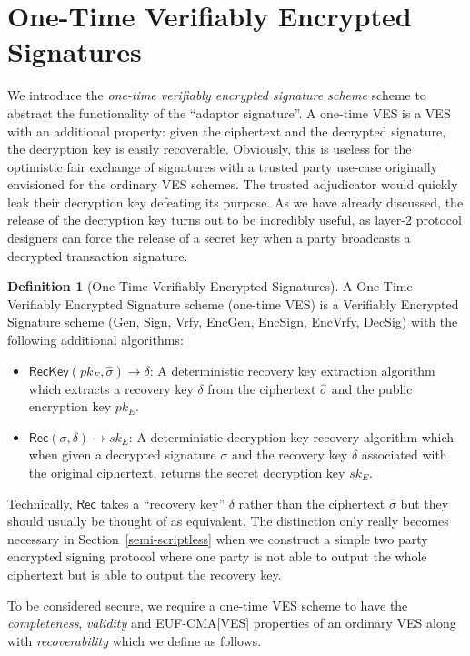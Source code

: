 \documentclass[fullpage]{article}
\theoremstyle{definition}
\newtheorem{definition}{Definition}[section]
\newcommand{\EUFCMAVES}{\textsf{EUF-CMA}[\textsf{VES}]\xspace}
\newcommand{\EncGen}{\textsf{EncGen}}
\newcommand{\EncSign}{\textsf{EncSign}}
\newcommand{\EncVer}{\textsf{EncVrfy}}
\newcommand{\DecSig}{\textsf{DecSig}}
\newcommand{\KeyGen}{\textsf{Gen}}
\newcommand{\Sign}{\textsf{Sign}}
\newcommand{\Verify}{\textsf{Vrfy}}
\newcommand{\Rec}{\textsf{Rec}}
\newcommand{\RecKey}{\textsf{RecKey}}
\newcommand{\rec}{\delta}
\newcommand{\VESALG}{\EncGen, \EncSign, \EncVer, \DecSig}
\newcommand{\SIGNALG}{\KeyGen, \Sign, \Verify}
\newcommand{\skEnc}{sk_E}
\newcommand{\pkEnc}{pk_E}
\newcommand{\hatsigma}{\hat{\sigma}}
\begin{document}
\section{One-Time Verifiably Encrypted Signatures}
\label{otVES}
We introduce the \emph{one-time verifiably encrypted signature scheme} scheme to abstract the functionality of the ``adaptor signature''\cite{poelstra-adaptor}. A one-time VES is a VES with an additional property: given the ciphertext and the decrypted signature, the decryption key is easily recoverable. Obviously, this is useless for the optimistic fair exchange of signatures with a trusted party use-case originally envisioned for the ordinary VES schemes. The trusted adjudicator would quickly leak their decryption key defeating its purpose. As we have already discussed, the release of the decryption key turns out to be incredibly useful, as layer-2 protocol designers can force the release of a secret key when a party broadcasts a decrypted transaction signature.

\begin{definition}[One-Time Verifiably Encrypted Signatures]
A One-Time Verifiably Encrypted Signature scheme (one-time VES) is a Verifiably Encrypted Signature scheme (\SIGNALG, \VESALG) with the following additional algorithms:
\begin{itemize}
    \item $\RecKey(\pkEnc, \hatsigma) \rightarrow \delta$: A deterministic recovery key extraction algorithm which extracts a recovery key $\delta$ from the ciphertext $\hatsigma$ and the public encryption key $\pkEnc$.
    \item $\Rec(\sigma,\rec) \rightarrow \skEnc$: A deterministic decryption key recovery algorithm which when given a decrypted signature $\sigma$ and the recovery key $\rec$ associated with the original ciphertext, returns the secret decryption key $\skEnc$.
\end{itemize}

\end{definition}

Technically, $\Rec$ takes a ``recovery key'' $\delta$ rather than the ciphertext $\hatsigma$ but they should usually be thought of as equivalent. The distinction only really becomes necessary in Section~\ref{semi-scriptless} when we construct a simple two party encrypted signing protocol where one party is not able to output the whole ciphertext but is able to output the recovery key.

To be considered secure, we require a one-time VES scheme to have the \emph{completeness}, \emph{validity} and \EUFCMAVES properties of an ordinary VES along with \emph{recoverability} which we define as follows.
\end{document}
